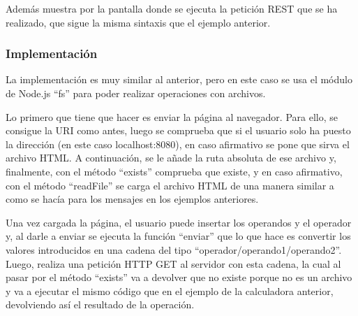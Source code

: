 \documentclass{article}
\begin{document}
Además muestra por la pantalla donde se ejecuta la petición REST que se ha realizado, que sigue la misma sintaxis que el ejemplo anterior.

\subsubsection{Implementación}
La implementación es muy similar al anterior, pero en este caso se usa el módulo de Node.js ``fs'' para poder realizar operaciones con archivos.

\bigskip

Lo primero que tiene que hacer es enviar la página al navegador. Para ello, se consigue la URI como antes, luego se comprueba que si el usuario solo ha puesto la dirección (en este caso localhost:8080), en caso afirmativo se pone que sirva el archivo HTML. A continuación, se le añade la ruta absoluta de ese archivo y, finalmente, con el método ``exists'' comprueba que existe, y en caso afirmativo, con el método ``readFile'' se carga el archivo HTML de una manera similar a como se hacía para los mensajes en los ejemplos anteriores.

\bigskip

Una vez cargada la página, el usuario puede insertar los operandos y el operador y, al darle a enviar se ejecuta la función ``enviar'' que lo que hace es convertir los valores introducidos en una cadena del tipo ``operador/operando1/operando2''. Luego, realiza una petición HTTP GET al servidor con esta cadena, la cual al pasar por el método ``exists'' va a devolver que no existe porque no es un archivo y va a ejecutar el mismo código que en el ejemplo de la calculadora anterior, devolviendo así el resultado de la operación.
\end{document}
